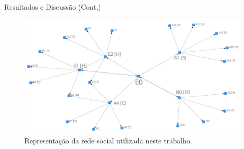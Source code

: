 \documentclass[10pt]{beamer}
\begin{document}
\section{}
\subsection{}
\begin{frame}{Resultados e Discussão (Cont.)}{}
\begin{figure}[htbp]
\centering
 \includegraphics[width=\textwidth]{figuras/grafo.pdf}
 \caption{Representação da rede social utilizada neste trabalho.}
\label{fig:grafos}
\end{figure}
\end{frame}


\section{}
\end{document}
